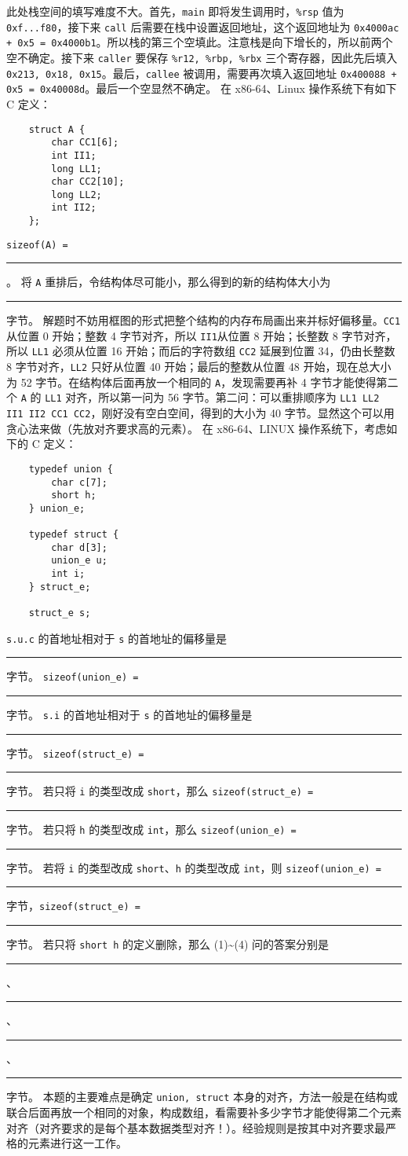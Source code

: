 \begin{problems}
        此处栈空间的填写难度不大。首先，\verb|main| 即将发生调用时，\verb|%rsp| 值为 \verb|0xf...f80|，接下来 \verb|call| 后需要在栈中设置返回地址，这个返回地址为 \verb|0x4000ac + 0x5 = 0x4000b1|。所以栈的第三个空填此。注意栈是向下增长的，所以前两个空不确定。接下来 \verb|caller| 要保存 \verb|%r12, %rbp, %rbx| 三个寄存器，因此先后填入 \verb|0x213, 0x18, 0x15|。最后，\verb|callee| 被调用，需要再次填入返回地址 \verb|0x400088 + 0x5 = 0x40008d|。最后一个空显然不确定。
        \pro 在 x86-64、Linux 操作系统下有如下 C 定义：
        \begin{verbatim}
    struct A {
        char CC1[6];
        int II1;
        long LL1;
        char CC2[10];
        long LL2;
        int II2;
    };
        \end{verbatim}
            \qn \verb|sizeof(A) = |\rule{2.5cm}{0.25mm}。
            \qn 将 \texttt{A} 重排后，令结构体尽可能小，那么得到的新的结构体大小为 \rule{2.5cm}{0.25mm} 字节。
        \sol 解题时不妨用框图的形式把整个结构的内存布局画出来并标好偏移量。\verb|CC1| 从位置 0 开始；整数 4 字节对齐，所以 \verb|II1|从位置 8 开始；长整数 8 字节对齐，所以 \verb|LL1| 必须从位置 16 开始；而后的字符数组 \verb|CC2| 延展到位置 34，仍由长整数 8 字节对齐，\verb|LL2| 只好从位置 40 开始；最后的整数从位置 48 开始，现在总大小为 52 字节。在结构体后面再放一个相同的 \verb|A|，发现需要再补 4 字节才能使得第二个 \verb|A| 的 \verb|LL1| 对齐，所以第一问为 56 字节。第二问：可以重排顺序为 \verb|LL1 LL2 II1 II2 CC1 CC2|，刚好没有空白空间，得到的大小为 40 字节。显然这个可以用贪心法来做（先放对齐要求高的元素）。
        \pro 在 x86-64、LINUX 操作系统下，考虑如下的 C 定义：
        \begin{verbatim}
    typedef union {
        char c[7];
        short h;
    } union_e;

    typedef struct {
        char d[3];
        union_e u;
        int i;
    } struct_e;

    struct_e s;
        \end{verbatim}
            \qn \verb|s.u.c| 的首地址相对于 \verb|s| 的首地址的偏移量是 \rule{2.5cm}{0.25mm} 字节。
            \qn \verb|sizeof(union_e) = |\rule{2.5cm}{0.25mm} 字节。
            \qn \verb|s.i| 的首地址相对于 \verb|s| 的首地址的偏移量是 \rule{2.5cm}{0.25mm} 字节。
            \qn \verb|sizeof(struct_e) = |\rule{2.5cm}{0.25mm} 字节。
            \qn 若只将 \verb|i| 的类型改成 \verb|short|，那么 \verb|sizeof(struct_e) = |\rule{2.5cm}{0.25mm} 字节。
            \qn 若只将 \verb|h| 的类型改成 \verb|int|，那么 \verb|sizeof(union_e) = |\rule{2.5cm}{0.25mm} 字节。
            \qn 若将 \verb|i| 的类型改成 \verb|short|、\verb|h| 的类型改成 \verb|int|，则 \verb|sizeof(union_e) = |\rule{2.5cm}{0.25mm} 字节，\verb|sizeof(struct_e) = |\rule{2.5cm}{0.25mm} 字节。
            \qn 若只将 \verb|short h| 的定义删除，那么 (1)\textasciitilde(4) 问的答案分别是 \rule{1cm}{0.25mm}、\rule{1cm}{0.25mm}、\rule{1cm}{0.25mm}、\rule{1cm}{0.25mm} 字节。
        \sol 本题的主要难点是确定 \verb|union, struct| 本身的对齐，方法一般是在结构或联合后面再放一个相同的对象，构成数组，看需要补多少字节才能使得第二个元素对齐（对齐要求的是每个基本数据类型对齐！）。经验规则是按其中对齐要求最严格的元素进行这一工作。


\end{problems}
